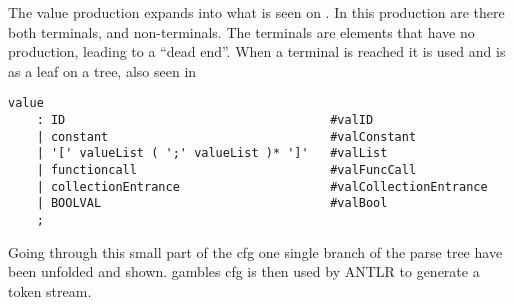 The value production expands into what is seen on .
In this production are there both terminals, and non-terminals.
The terminals are elements that have no production, leading to a ``dead end''.
When a terminal is reached it is used and is as a leaf on a tree, also seen in 
\begin{lstlisting}[caption={\acrshort{cfg} Value},frame=tlrb,label={lst:value},numbers=none]
value
    : ID                                     #valID
    | constant                               #valConstant
    | '[' valueList ( ';' valueList )* ']'   #valList
    | functioncall                           #valFuncCall
    | collectionEntrance                     #valCollectionEntrance
    | BOOLVAL                                #valBool
    ;
\end{lstlisting}

Going through this small part of the \acrshort{cfg} one single branch of the parse tree have been unfolded and shown.
\gls{gamble}s \acrshort{cfg} is then used by ANTLR to generate a token stream. 
